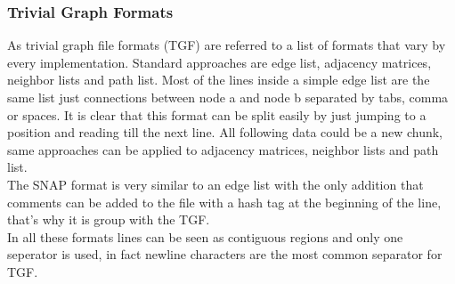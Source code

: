 \subsubsection{Trivial Graph Formats}
As trivial graph file formats (TGF) are referred to a list of formats that vary by every implementation. Standard approaches are edge list, adjacency matrices, neighbor lists and path list.
Most of the lines inside a simple edge list are the same list just connections between node a and node b separated by tabs, comma or spaces. It is clear that this format can be split easily by just jumping to a position and reading till the next line. All following data could be a new chunk, same approaches can be applied to adjacency matrices, neighbor lists and path list.\\
The SNAP format is very similar to an edge list with the only addition that comments can be added to the file with a hash tag at the beginning of the line, that’s why it is group with the TGF.\\
In all these formats lines can be seen as contiguous regions and only one seperator is used, in fact newline characters are the most common separator for TGF. 

